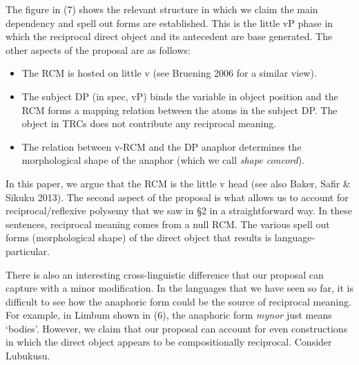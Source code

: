 \documentclass[output=paper]{langsci/langscibook}
\begin{document}
 



The figure in (7) shows the relevant structure in which we claim the main dependency and spell out forms are established. This is the little vP phase in which the reciprocal direct object and its antecedent are base generated. The other aspects of the proposal are as follows:


\begin{itemize}
\item The RCM is hosted on little v (see Bruening 2006 for a similar view).

\item The subject DP (in spec, vP) binds the variable in object position and the RCM forms a mapping relation between the atoms in the subject DP. The object in TRCs does not contribute any reciprocal meaning.

\item The relation between v-RCM and the DP anaphor determines the morphological shape of the anaphor (which we call \textit{shape concord}).

\end{itemize}

In this paper, we argue that the RCM is the little v head (see also Baker, Safir \& Sikuku 2013). The second aspect of the proposal is what allows us to account for reciprocal/reflexive polysemy that we saw in §2 in a straightforward way. In these sentences, reciprocal meaning comes from a null RCM. The various spell out forms (morphological shape) of the direct object that results is language-particular. 

  There is also an interesting cross-linguistic difference that our proposal can capture with a minor modification. In the languages that we have seen so far, it is difficult to see how the anaphoric form could be the source of reciprocal meaning. For example, in Limbum shown in (6), the anaphoric form \textit{mynor} just means ‘bodies’. However, we claim that our proposal can account for even constructions in which the direct object appears to be compositionally reciprocal. Consider Lubukusu.



\ea\label{ex:}
\\
\ea\label{ex:}
\\
\ea\label{ex:}
\\
\ea\label{ex:}
\\
\end{document}
